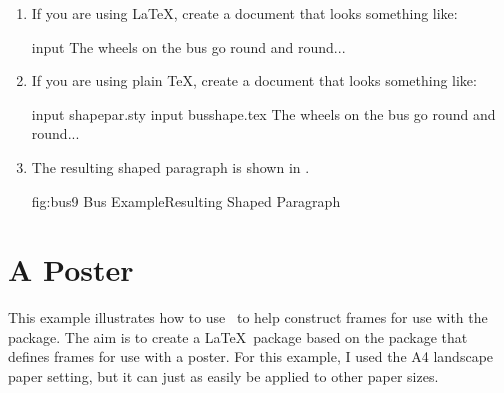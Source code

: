 \begin{enumerate}
\item If you are using \LaTeX, create a document that looks something
like:
\begin{codebox}
\gls{input}
The wheels on the bus go round and round...
\codepar
{}
\end{codebox}

\item If you are using plain \TeX, create a document that looks
something like:
\begin{codebox}
\gls{input} shapepar.sty
\codepar
\gls{input} busshape.tex
The wheels on the bus go round and round...
\codepar
{}
\end{codebox}

\item The resulting shaped paragraph is shown in .

\FloatFig
  {fig:bus9}
  {}
  {Bus Example\dash Resulting Shaped Paragraph}

\end{enumerate}

\section{A Poster}\label{sec:postertutorial}

This example illustrates how to use \FlowframTk\ to help construct
frames for use with the  package.
The aim is to create a \LaTeX\ package based on the
 package that defines frames for use with a
poster. For this example, I used the A4 landscape paper setting,
but it can just as easily be applied to other paper sizes.


